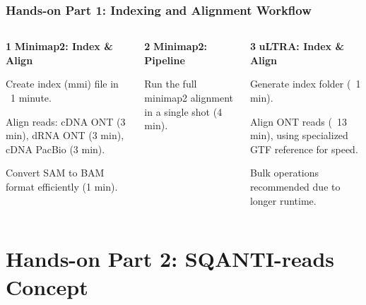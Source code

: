 \documentclass[aspectratio=169]{beamer}
\begin{document}
\begin{frame}
  \frametitle{Hands-on Part 1: Indexing and Alignment Workflow}
  \begin{columns}[T]
    \begin{column}{0.3\textwidth}
      \textbf{1} \textbf{Minimap2: Index \& Align}
      \vspace{0.3cm}
      
      Create index (mmi) file in ~1 minute.
      
      Align reads: cDNA ONT (3 min), dRNA ONT (3 min), cDNA PacBio (3 min).
      
      Convert SAM to BAM format efficiently (1 min).
    \end{column}
    \begin{column}{0.3\textwidth}
      \textbf{2} \textbf{Minimap2: Pipeline}
      \vspace{0.3cm}
      
      Run the full minimap2 alignment in a single shot (4 min).
    \end{column}
    \begin{column}{0.3\textwidth}
      \textbf{3} \textbf{uLTRA: Index \& Align}
      \vspace{0.3cm}
      
      Generate index folder (~1 min).
      
      Align ONT reads (~13 min), using specialized GTF reference for speed.
      
      Bulk operations recommended due to longer runtime.
    \end{column}
  \end{columns}
\end{frame}

\section{Hands-on Part 2: SQANTI-reads Concept}
\end{document}
